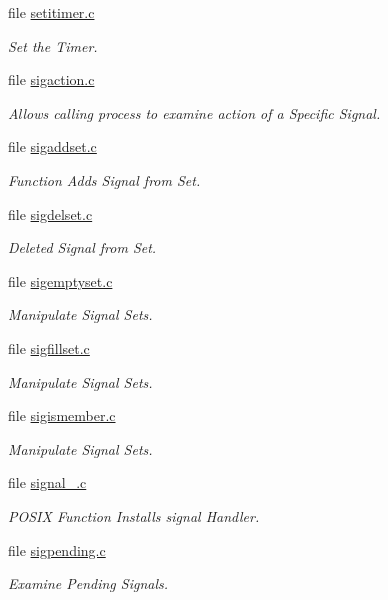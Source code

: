\begin{DoxyCompactItemize}
file \mbox{\hyperlink{setitimer_8c}{setitimer.\+c}}
\begin{DoxyCompactList}\small\item\em Set the Timer. \end{DoxyCompactList}\item 
file \mbox{\hyperlink{sigaction_8c}{sigaction.\+c}}
\begin{DoxyCompactList}\small\item\em Allows calling process to examine action of a Specific Signal. \end{DoxyCompactList}\item 
file \mbox{\hyperlink{sigaddset_8c}{sigaddset.\+c}}
\begin{DoxyCompactList}\small\item\em Function Adds Signal from Set. \end{DoxyCompactList}\item 
file \mbox{\hyperlink{sigdelset_8c}{sigdelset.\+c}}
\begin{DoxyCompactList}\small\item\em Deleted Signal from Set. \end{DoxyCompactList}\item 
file \mbox{\hyperlink{sigemptyset_8c}{sigemptyset.\+c}}
\begin{DoxyCompactList}\small\item\em Manipulate Signal Sets. \end{DoxyCompactList}\item 
file \mbox{\hyperlink{sigfillset_8c}{sigfillset.\+c}}
\begin{DoxyCompactList}\small\item\em Manipulate Signal Sets. \end{DoxyCompactList}\item 
file \mbox{\hyperlink{sigismember_8c}{sigismember.\+c}}
\begin{DoxyCompactList}\small\item\em Manipulate Signal Sets. \end{DoxyCompactList}\item 
file \mbox{\hyperlink{signal__2_8c}{signal\+\_.\+c}}
\begin{DoxyCompactList}\small\item\em P\+O\+S\+IX Function Installs signal Handler. \end{DoxyCompactList}\item 
file \mbox{\hyperlink{sigpending_8c}{sigpending.\+c}}
\begin{DoxyCompactList}\small\item\em Examine Pending Signals. \end{DoxyCompactList}\item 

\end{DoxyCompactItemize}

